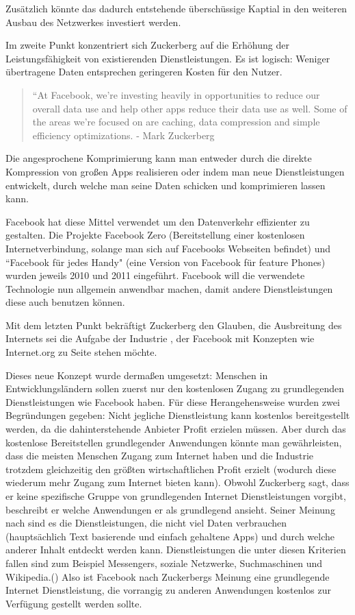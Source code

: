 \documentclass{article}
\begin{document}
Zusätzlich könnte das dadurch entstehende überschüssige Kaptial in den weiteren Ausbau des Netzwerkes investiert werden.

\medskip

Im zweite Punkt konzentriert sich Zuckerberg auf die Erhöhung der Leistungsfähigkeit von existierenden Dienstleistungen.
Es ist logisch: Weniger übertragene Daten entsprechen geringeren Kosten für den Nutzer.

\begin{quote}
``At Facebook, we’re investing heavily in opportunities to reduce our overall data use and help  other apps     
reduce their data use as well. Some of the areas we’re focused on are caching, data compression and simple efficiency optimizations.
- Mark Zuckerberg \textcite[8]{HumanRight}
\end{quote}

Die angesprochene Komprimierung kann man entweder durch die direkte Kompression von großen Apps realisieren oder indem man neue Dienstleistungen entwickelt, durch welche man seine Daten schicken und komprimieren lassen kann.

Facebook hat diese Mittel verwendet um den Datenverkehr effizienter zu gestalten.
Die Projekte Facebook Zero (Bereitstellung einer kostenlosen Internetverbindung, solange man sich auf Facebooks Webseiten befindet) und ``Facebook für jedes Handy" (eine Version von Facebook für feature Phones) wurden jeweils  2010 und 2011 eingeführt.
Facebook will die verwendete Technologie nun allgemein anwendbar machen, damit andere Dienstleistungen diese auch benutzen können.

\medskip

Mit dem letzten Punkt bekräftigt Zuckerberg den Glauben, die Ausbreitung des Internets sei die Aufgabe der Industrie , der Facebook mit Konzepten wie Internet.org zu Seite stehen möchte.

Dieses neue Konzept wurde dermaßen umgesetzt: Menschen in Entwicklungsländern sollen zuerst nur den kostenlosen Zugang zu grundlegenden Dienstleistungen wie Facebook haben.
Für diese Herangehensweise wurden zwei Begründungen gegeben:
\medskip
Nicht jegliche Dienstleistung kann kostenlos bereitgestellt werden, da die dahinterstehende Anbieter Profit erzielen müssen. 
Aber durch das kostenlose Bereitstellen grundlegender Anwendungen könnte man gewährleisten, dass die meisten Menschen Zugang zum Internet haben und die Industrie trotzdem gleichzeitig den größten wirtschaftlichen Profit erzielt (wodurch diese wiederum mehr Zugang zum Internet bieten kann).
Obwohl Zuckerberg sagt, dass er keine spezifische Gruppe von grundlegenden Internet Dienstleistungen vorgibt, beschreibt er welche Anwendungen er als grundlegend ansieht.
Seiner Meinung nach sind es die Dienstleistungen, die nicht viel Daten verbrauchen (hauptsächlich Text basierende und einfach gehaltene Apps) und durch welche anderer Inhalt entdeckt werden kann.
Dienstleistungen die unter diesen Kriterien fallen sind zum Beispiel Messengers, soziale Netzwerke, Suchmaschinen und Wikipedia.(\cite[5]{HumanRight})
Also ist Facebook nach Zuckerbergs Meinung eine grundlegende Internet Dienstleistung, die vorrangig zu anderen Anwendungen kostenlos zur Verfügung gestellt werden sollte.
\end{document}
